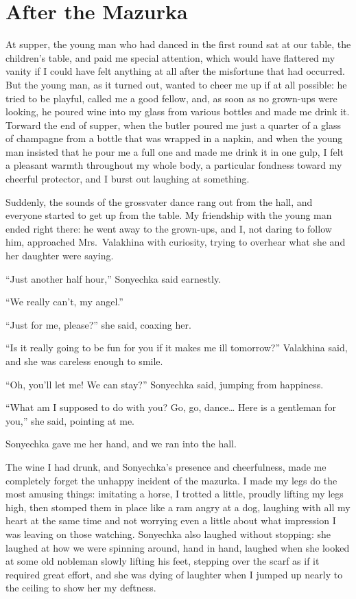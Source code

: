 \chapter{After the Mazurka} %

At supper, the young man who had danced in the first round sat at our table, the children's table, and paid me special attention, which would have flattered my vanity if I could have felt anything at all after the misfortune that had occurred. But the young man, as it turned out, wanted to cheer me up if at all possible: he tried to be playful, called me a good fellow, and, as soon as no grown-ups were looking, he poured wine into my glass from various bottles and made me drink it. Torward the end of supper, when the butler poured me just a quarter of a glass of champagne from a bottle that was wrapped in a napkin, and when the young man insisted that he pour me a full one and made me drink it in one gulp, I felt a pleasant warmth throughout my whole body, a particular fondness toward my cheerful protector, and I burst out laughing at something.

Suddenly, the sounds of the grossvater dance rang out from the hall, and everyone started to get up from the table. My friendship with the young man ended right there: he went away to the grown-ups, and I, not daring to follow him, approached Mrs.~Valakhina with curiosity, trying to overhear what she and her daughter were saying.

``Just another half hour,'' Sonyechka said earnestly. %

``We really can't, my angel.'' %

``Just for me, please?'' she said, coaxing her. %

``Is it really going to be fun for you if it makes me ill tomorrow?'' Valakhina said, and she was careless enough to smile. %

``Oh, you'll let me! We can stay?'' Sonyechka said, jumping from happiness. %

``What am I supposed to do with you? Go, go, dance\ldots{} Here is a gentleman for you,'' she said, pointing at me. %

Sonyechka gave me her hand, and we ran into the hall.

The wine I had drunk, and Sonyechka's presence and cheerfulness, made me completely forget the unhappy incident of the mazurka. I made my legs do the most amusing things: imitating a horse, I trotted a little, proudly lifting my legs high, then stomped them in place like a ram angry at a dog, laughing with all my heart at the same time and not worrying even a little about what impression I was leaving on those watching. Sonyechka also laughed without stopping: she laughed at how we were spinning around, hand in hand, laughed when she looked at some old nobleman slowly lifting his feet, stepping over the scarf as if it required great effort, and she was dying of laughter when I jumped up nearly to the ceiling to show her my deftness.

